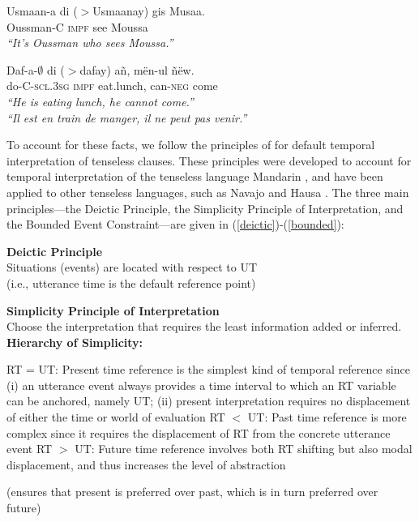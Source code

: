 \documentclass[output=paper
,modfonts
,nonflat]{langsci/langscibook}
\begin{document}
\ea
\gll Usmaan-a {di ($>$Usmaanay)} gis Musaa. \\
Oussman-C \textsc{impf} see Moussa \\
\glt \textit{``It's Oussman who sees Moussa.''}\label{see1}
\z

\ea
\gll Daf-a-$\emptyset$ {di ($>$dafay)} a\~n, m\"en-ul \~n\"ew.\\
do-C-\textsc{scl.3sg} \textsc{impf} eat.lunch, can-\textsc{neg} come\\
\glt \textit{``He is eating lunch, he cannot come.''}\\
\textit{``Il est en train de manger, il ne peut pas venir.''}\hfill\citep[p.~263]{robert91approche}\label{eat2}
\z




To account for these facts, we follow the principles of \citet{smith05temporal, smith07time} for default temporal interpretation of tenseless clauses. These principles were developed to account for temporal interpretation of the tenseless language Mandarin \citep{smith05temporal}, and have been applied to other tenseless languages, such as Navajo \citep{smith07time} and Hausa \citep{mucha13temporal}. The three main principles---the Deictic Principle, the Simplicity Principle of Interpretation, and the Bounded Event Constraint---are given in (\ref{deictic})-(\ref{bounded}):

\ea\label{deictic} \textbf{Deictic Principle} \\ Situations (events) are located with respect to UT \\(i.e., utterance time is the default reference point)
\z

\begin{exe}
\ex\label{simplicity} \textbf{Simplicity Principle of Interpretation} \\
Choose the interpretation that requires the least information added or
inferred. \smallskip \\
\textbf{Hierarchy of Simplicity:} 
\begin{xlist}
\ex\label{simple1} RT = UT: Present time reference is the simplest kind of temporal reference since (i) an utterance event always provides a time interval to which an RT variable can be anchored, namely UT; (ii) present interpretation requires no displacement of either the time or world of evaluation
\ex\label{simple2} RT $<$ UT: Past time reference is more complex since it requires the displacement of RT from the concrete utterance event
\ex\label{simple3} RT $>$ UT: Future time reference involves both RT shifting but also modal displacement, and thus increases the level of abstraction
\end{xlist}
(ensures that present is preferred over past, which is in turn preferred over future)
\end{exe}
\end{document}
